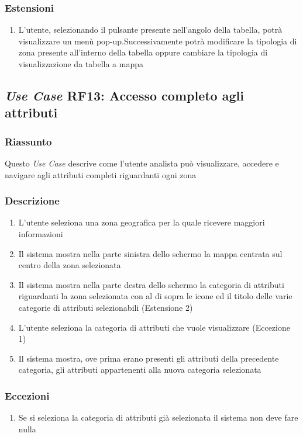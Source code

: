         \subsubsection{Estensioni}
            \begin{enumerate}
                \item L'utente, selezionando il pulsante presente nell'angolo della tabella, potrà visualizzare un menù pop-up.Successivamente potrà modificare la tipologia di zona presente all'interno della tabella oppure cambiare la tipologia di visualizzazione da tabella a mappa
            \end{enumerate}

    \subsection{\textit{Use Case} RF13: Accesso completo agli attributi}
        \subsubsection{Riassunto}
            Questo \textit{Use Case} descrive come l'utente analista può visualizzare, accedere e navigare agli attributi completi riguardanti ogni zona
        \subsubsection{Descrizione}
            \begin{enumerate}
                \item L'utente seleziona una zona geografica per la quale ricevere maggiori informazioni
                \item Il sistema mostra nella parte sinistra dello schermo la mappa centrata sul centro della zona selezionata
                \item Il sistema mostra nella parte destra dello schermo la categoria di attributi riguardanti la zona selezionata con al di sopra le icone ed il titolo delle varie categorie di attributi selezionabili (Estensione 2)
                \item L'utente seleziona la categoria di attributi che vuole visualizzare (Eccezione 1)
                \item Il sistema mostra, ove prima erano presenti gli attributi della precedente categoria, gli attributi appartenenti alla nuova categoria selezionata
            \end{enumerate}
        \subsubsection{Eccezioni}
            \begin{enumerate}
                \item Se si seleziona la categoria di attributi già selezionata il sistema non deve fare nulla
            \end{enumerate}
